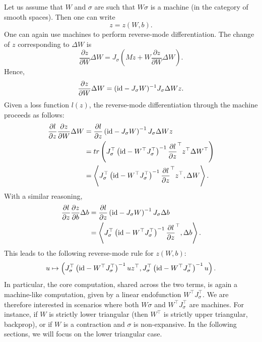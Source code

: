 \documentclass[12pt]{article}
\newcommand{\id}{{\textnormal{id}}}
\begin{document}
Let us assume that $W$ and $\sigma$ are such that $W\sigma$ is a machine (in the category of smooth spaces). Then one can write
\begin{equation*}
    z = z(W, b).
\end{equation*}
One can again use machines to perform reverse-mode differentiation. The change of $z$ corresponding to $\Delta W$ is
\begin{equation*}
    \frac{\partial z}{\partial W} \Delta W = J_\sigma \left(Mz + W \frac{\partial z}{\partial W} \Delta W\right).
\end{equation*}
Hence,
\begin{equation*}
    \frac{\partial z}{\partial W} \Delta W = (\id - J_\sigma W)^{-1} J_\sigma \Delta W z.
\end{equation*}
Given a loss function $l(z)$, the reverse-mode differentiation through the machine proceeds as follows:
\begin{align*}
    \frac{\partial l}{\partial z} \frac{\partial z}{\partial W} \Delta W
    &= \frac{\partial l}{\partial z} \left(\id - J_\sigma W\right)^{-1} J_\sigma \Delta W z\\
    &= tr\left(J_\sigma^\top \left(\id - W^\top J_\sigma^\top\right)^{-1}\frac{\partial l}{\partial z}^\top z^\top \Delta W^\top\right) \\
    &= \left\langle J_\sigma^\top \left(\id - W^\top J_\sigma^\top\right)^{-1}\frac{\partial l}{\partial z}^\top z^\top, \Delta W\right\rangle.
\end{align*}
With a similar reasoning,
\begin{align*}
    \frac{\partial l}{\partial z} \frac{\partial z}{\partial b} \Delta b
    &= \frac{\partial l}{\partial z} \left(\id - J_\sigma W\right)^{-1} J_\sigma \Delta b\\
    &= \left\langle J_\sigma^\top \left(\id - W^\top J_\sigma^\top\right)^{-1}\frac{\partial l}{\partial z}^\top, \Delta b\right\rangle.
\end{align*}
This leads to the following reverse-mode rule for $z(W, b)$:
\begin{equation*}
    u \mapsto \left(J_\sigma^\top \left(\id - W^\top J_\sigma^\top\right)^{-1}u z^\top, J_\sigma^\top \left(\id - W^\top J_\sigma^\top\right)^{-1}u\right).
\end{equation*}
In particular, the core computation, shared across the two terms, is again a machine-like computation, given by a linear endofunction $W^\top J_\sigma^\top$. We are therefore interested in scenarios where both $W \sigma$ and $W^\top J_\sigma^\top$ are machines. For instance, if $W$ is strictly lower triangular (then $W^\top$ is strictly upper triangular, backprop), or if $W$ is a contraction and $\sigma$ is non-expansive. In the following sections, we will focus on the lower triangular case.
\end{document}
